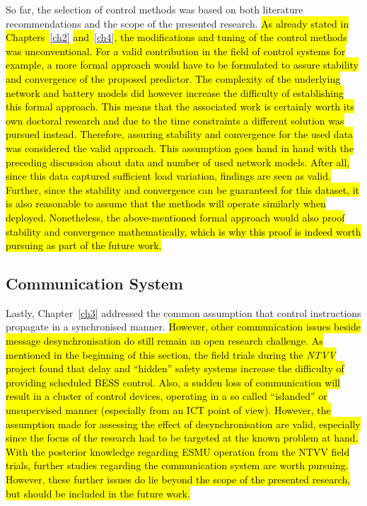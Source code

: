 So far, the selection of control methods was based on both literature recommendations and the scope of the presented research.
\hl{As already stated in Chapters~}\ref{ch2}\hl{ and~}\ref{ch4}\hl{, the modifications and tuning of the control methods was unconventional.
For a valid contribution in the field of control systems for example, a more formal approach would have to be formulated to assure stability and convergence of the proposed predictor.
The complexity of the underlying network and battery models did however increase the difficulty of establishing this formal approach.
This means that the associated work is certainly worth its own doctoral research and due to the time constraints a different solution was pursued instead.
Therefore, assuring stability and convergence for the used data was considered the valid approach.
This assumption goes hand in hand with the preceding discussion about data and number of used network models.
After all, since this data captured sufficient load variation, findings are seen as valid.
Further, since the stability and convergence can be guaranteed for this dataset, it is also reasonable to assume that the methods will operate similarly when deployed.
Nonetheless, the above-mentioned formal approach would also proof stability and convergence mathematically, which is why this proof is indeed worth pursuing as part of the future work.}

\subsection{Communication System}

Lastly, Chapter~\ref{ch3} addressed the common assumption that control instructions propagate in a synchronised manner.
\hl{However, other communication issues beside message desynchronisation do still remain an open research challenge.
As mentioned in the beginning of this section, the field trials during the \textit{NTVV} project found that delay and ``hidden'' safety systems increase the difficulty of providing scheduled BESS control.
Also, a sudden loss of communication will result in a cluster of control devices, operating in a so called ``islanded'' or unsupervised manner (especially from an ICT point of view).
However, the assumption made for assessing the effect of desynchronisation are valid, especially since the focus of the research had to be targeted at the known problem at hand.
With the posterior knowledge regarding ESMU operation from the NTVV field trials, further studies regarding the communication system are worth pursuing.
However, these further issues do lie beyond the scope of the presented research, but should be included in the future work.}
